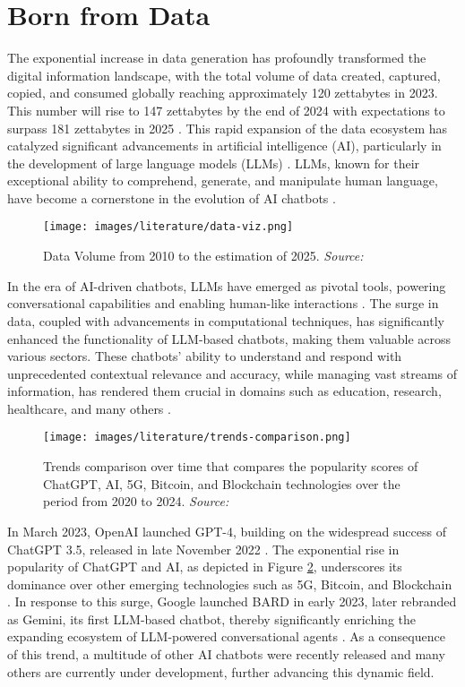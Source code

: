 \section{Born from Data}

The exponential increase in data generation has profoundly transformed the digital information landscape, with the total volume of data created, captured, copied, and consumed globally reaching approximately 120 zettabytes in 2023. This number will rise to 147 zettabytes by the end of 2024 with expectations to surpass 181 zettabytes in 2025 \cite{taylor2023volume}. This rapid expansion of the data ecosystem has catalyzed significant advancements in artificial intelligence (AI), particularly in the development of large language models (LLMs) \cite{zhao2023survey}. LLMs, known for their exceptional ability to comprehend, generate, and manipulate human language, have become a cornerstone in the evolution of AI chatbots \cite{brown2020language}.

\begin{figure}[h!]
    \centering
    \texttt{[image: images/literature/data-viz.png]}
    \caption{Data Volume from 2010 to the estimation of 2025. \textit{Source:} \cite{taylor2023volume}}
    \label{fig:data_volume}
\end{figure}

In the era of AI-driven chatbots, LLMs have emerged as pivotal tools, powering conversational capabilities and enabling human-like interactions \cite{koubaa2023exploring}. The surge in data, coupled with advancements in computational techniques, has significantly enhanced the functionality of LLM-based chatbots, making them valuable across various sectors. These chatbots' ability to understand and respond with unprecedented contextual relevance and accuracy, while managing vast streams of information, has rendered them crucial in domains such as education, research, healthcare, and many others \cite{dam2024complete}.

\begin{figure}[h!]
    \centering
    \texttt{[image: images/literature/trends-comparison.png]}
    \caption{Trends comparison over time that compares the popularity scores of ChatGPT, AI, 5G, Bitcoin, and Blockchain technologies over the period from 2020 to 2024. \textit{Source:} \cite{googletrends2023}}
    \label{fig:chatgpt_popularity}
\end{figure}

In March 2023, OpenAI launched GPT-4, building on the widespread success of ChatGPT 3.5, released in late November 2022 \cite{bahrini2023chatgpt, zhang2023one}. The exponential rise in popularity of ChatGPT and AI, as depicted in Figure \ref{fig:chatgpt_popularity}, underscores its dominance over other emerging technologies such as 5G, Bitcoin, and Blockchain \cite{googletrends2023}. In response to this surge, Google launched BARD in early 2023, later rebranded as Gemini, its first LLM-based chatbot, thereby significantly enriching the expanding ecosystem of LLM-powered conversational agents \cite{wikipedia2023gemini}. As a consequence of this trend, a multitude of other AI chatbots were recently released and many others are currently under development, further advancing this dynamic field.

